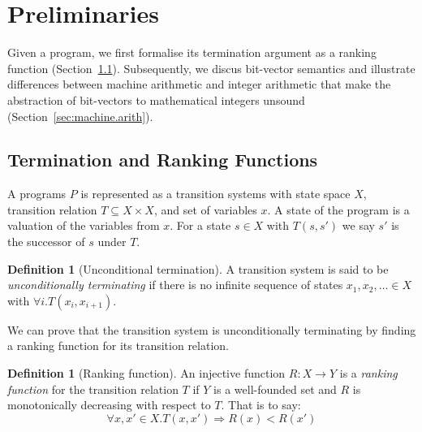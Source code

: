 \documentclass[preprint]{sigplanconf}
\theoremstyle{definition}
\newtheorem{definition}[theorem]{Definition}
\begin{document}


\section{Preliminaries}
Given a program, %
we first formalise its termination argument as a ranking function (Section~\ref{sec:ranking.functions}). 
Subsequently, we discus bit-vector semantics and illustrate 
differences between machine arithmetic and integer arithmetic that
make the abstraction of bit-vectors to mathematical integers unsound (Section~\ref{sec:machine.arith}).



\subsection{Termination and Ranking Functions} \label{sec:ranking.functions}
A programs $P$ is represented as a transition systems with state space $X$, transition relation $T \subseteq X \times X$, and set of variables $x$. 
A state of the program is a valuation of the variables from $x$. For a state $s \in X$ with $T(s,s')$ we say $s'$
is the successor of $s$ under $T$. 

\begin{definition}[Unconditional termination]
A transition system is said to be \emph{unconditionally terminating} if there is no infinite sequence of states
$x_1, x_2, \ldots \in X$ with $\forall i . T(x_i, x_{i+1})$.  
\end{definition}

We can prove that the transition system is unconditionally terminating by finding a ranking function for its transition relation.

\begin{definition}[Ranking function]
An injective function ${R:X\to Y}$ is a \emph{ranking function} for the transition relation $T$ if $Y$ is a well-founded set and 
$R$ is monotonically decreasing with respect to $T$.  That is
to say:
$$\forall x, x' \in X. T(x, x') \Rightarrow R(x) < R(x')$$
\end{definition}
\end{document}
